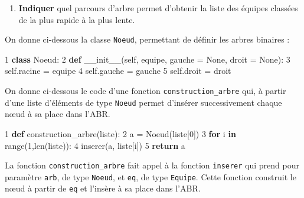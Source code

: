 \documentclass[
  paper=a4,
  ,captions=tableheading
]{scrartcl}
\newenvironment{Shaded}{}{}
\newcommand{\BuiltInTok}[1]{\textcolor[rgb]{0.00,0.50,0.00}{#1}}
\newcommand{\ControlFlowTok}[1]{\textcolor[rgb]{0.00,0.44,0.13}{\textbf{#1}}}
\newcommand{\DecValTok}[1]{\textcolor[rgb]{0.25,0.63,0.44}{#1}}
\newcommand{\FunctionTok}[1]{\textcolor[rgb]{0.02,0.16,0.49}{#1}}
\newcommand{\KeywordTok}[1]{\textcolor[rgb]{0.00,0.44,0.13}{\textbf{#1}}}
\newcommand{\NormalTok}[1]{#1}
\newcommand{\OperatorTok}[1]{\textcolor[rgb]{0.40,0.40,0.40}{#1}}
\newcommand{\VariableTok}[1]{\textcolor[rgb]{0.10,0.09,0.49}{#1}}
\providecommand{\tightlist}{%
  \setlength{\itemsep}{0pt}\setlength{\parskip}{0pt}}
\begin{document}
\begin{enumerate}
\def\labelenumi{\arabic{enumi}.}
\setcounter{enumi}{8}
\tightlist
\item
  \textbf{Indiquer} quel parcours d'arbre permet d'obtenir la liste des
  équipes classées de la plus rapide à la plus lente.
\end{enumerate}

On donne ci-dessous la classe \texttt{Noeud}, permettant de définir les
arbres binaires :

\begin{Shaded}
\begin{Highlighting}[]
\DecValTok{1} \KeywordTok{class}\NormalTok{ Noeud:}
\DecValTok{2}   \KeywordTok{def} \FunctionTok{\_\_init\_\_}\NormalTok{(}\VariableTok{self}\NormalTok{, equipe, gauche }\OperatorTok{=} \VariableTok{None}\NormalTok{, droit }\OperatorTok{=} \VariableTok{None}\NormalTok{):}
\DecValTok{3}       \VariableTok{self}\NormalTok{.racine }\OperatorTok{=}\NormalTok{ equipe}
\DecValTok{4}       \VariableTok{self}\NormalTok{.gauche }\OperatorTok{=}\NormalTok{ gauche}
\DecValTok{5}       \VariableTok{self}\NormalTok{.droit }\OperatorTok{=}\NormalTok{ droit}
\end{Highlighting}
\end{Shaded}

On donne ci-dessous le code d'une fonction \texttt{construction\_arbre}
qui, à partir d'une liste d'éléments de type \texttt{Noeud} permet
d'insérer successivement chaque nœud à sa place dans l'ABR.

\begin{Shaded}
\begin{Highlighting}[]
\DecValTok{1} \KeywordTok{def}\NormalTok{ construction\_arbre(liste):}
\DecValTok{2}\NormalTok{   a }\OperatorTok{=}\NormalTok{ Noeud(liste[}\DecValTok{0}\NormalTok{])}
\DecValTok{3}   \ControlFlowTok{for}\NormalTok{ i }\KeywordTok{in} \BuiltInTok{range}\NormalTok{(}\DecValTok{1}\NormalTok{,}\BuiltInTok{len}\NormalTok{(liste)):}
\DecValTok{4}\NormalTok{       inserer(a, liste[i])}
\DecValTok{5}   \ControlFlowTok{return}\NormalTok{ a}
\end{Highlighting}
\end{Shaded}

La fonction \texttt{construction\_arbre} fait appel à la fonction
\texttt{inserer} qui prend pour paramètre \texttt{arb}, de type
\texttt{Noeud}, et \texttt{eq}, de type \texttt{Equipe}. Cette fonction
construit le nœud à partir de \texttt{eq} et l'insère à sa place dans
l'ABR.
\end{document}
